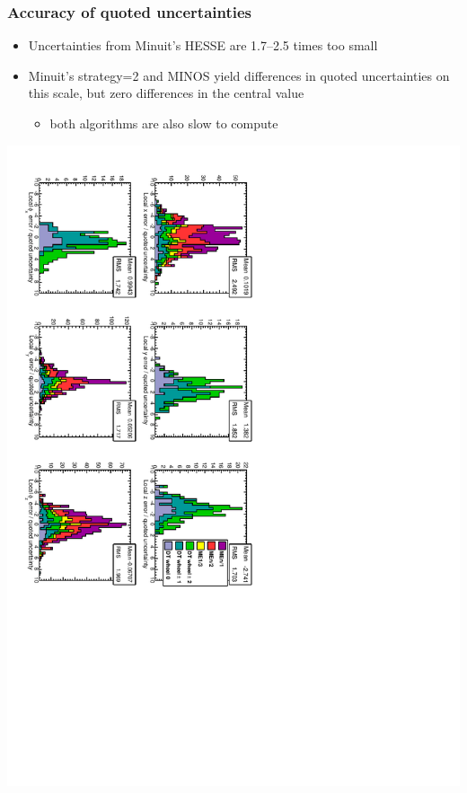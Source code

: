\documentclass[compress]{beamer}
\begin{document}
\begin{frame}
\frametitle{Accuracy of quoted uncertainties}

\begin{itemize}
\item Uncertainties from Minuit's HESSE are 1.7--2.5 times too small
\item Minuit's strategy=2 and MINOS yield differences in quoted
  uncertainties on this scale, but zero differences in the central value
\begin{itemize}
\item both algorithms are also slow to compute
\end{itemize}
\end{itemize}

\includegraphics[height=\linewidth, angle=90]{mc_accuracy_of_uncertainties.pdf}
\end{frame}
\end{document}
